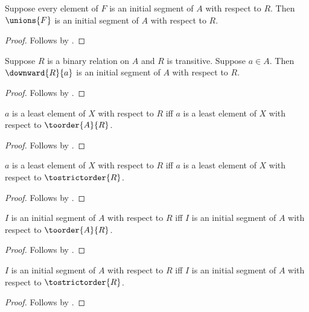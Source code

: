 \begin{proposition}\label{union_initial_segments}
    Suppose every element of $F$ is an initial segment of $A$ with respect to $R$.
    Then $\unions{F}$ is an initial segment of $A$ with respect to $R$.
\end{proposition}
\begin{proof}
    Follows by .
\end{proof}

\begin{proposition}\label{principal_initial_segment}
    Suppose $R$ is a binary relation on $A$ and $R$ is transitive.
    Suppose $a\in A$.
    Then $\downward{R}{a}$ is an initial segment of $A$ with respect to $R$.
\end{proposition}
\begin{proof}
    Follows by .
\end{proof}

\begin{proposition}\label{least_element_toorder_iff}
    $a$ is a least element of $X$ with respect to $R$ iff
        $a$ is a least element of $X$ with respect to $\toorder{A}{R}$.
\end{proposition}
\begin{proof}
    Follows by .
\end{proof}

\begin{proposition}\label{least_element_tostrictorder_iff}
    $a$ is a least element of $X$ with respect to $R$ iff
        $a$ is a least element of $X$ with respect to $\tostrictorder{R}$.
\end{proposition}
\begin{proof}
    Follows by .
\end{proof}

\begin{proposition}\label{initial_segment_toorder_iff}
    $I$ is an initial segment of $A$ with respect to $R$ iff
        $I$ is an initial segment of $A$ with respect to $\toorder{A}{R}$.
\end{proposition}
\begin{proof}
    Follows by .
\end{proof}

\begin{proposition}\label{initial_segment_tostrictorder_iff}
    $I$ is an initial segment of $A$ with respect to $R$ iff
        $I$ is an initial segment of $A$ with respect to $\tostrictorder{R}$.
\end{proposition}
\begin{proof}
    Follows by .
\end{proof}

